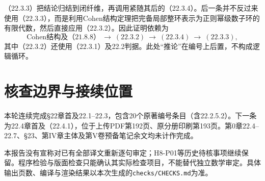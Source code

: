 （22.3.3）把结论归结到闭纤维，再调用紧随其后的（22.3.4）。后一条并不反过来使用（22.3.3），而是利用Cohen结构定理把完备局部整环表示为正则幂级数子环的有限代数，然后直接应用（22.3.2）。因此证明依赖为
\[
 \text{Cohen结构及（21.8.8）}
 \ \to\ (22.3.2)\ \to\ (22.3.4)\ \to\ (22.3.3),
\]
其中（22.3.2）还使用（22.3.1）及22.2判据。此处“推论”在编号上后置，不构成逻辑循环。

\section*{核查边界与接续位置}
本轮连续完成§22章首及22.1--22.3，包含20个原著编号条目（含22.2.5.2）。下一条为22.4章首及（22.4.1），位于上传PDF第192页、原分册印刷第193页。第0章22.4--22.7、§23、第IV章主体及第V卷预备笔记余文均未计作完成。

本报告没有宣称对已有全部译文重新逐句审定；H8-P01等历史待核事项继续保留。程序检验与版面检查只能确认其实际检查项目，不能替代独立数学审定。具体输出页数、编译与渲染结果以本次生成的\texttt{checks/CHECKS.md}为准。
